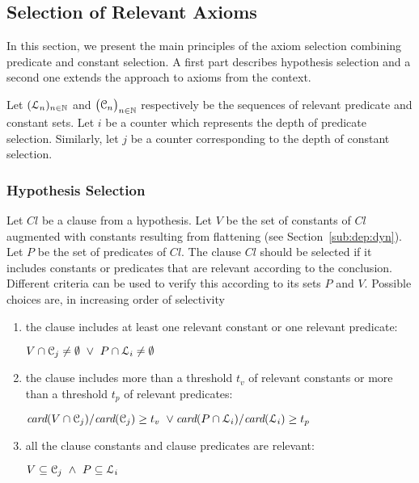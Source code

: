 \documentclass{acm_proc_article-sp}
\theoremstyle{nonumberplain}
\newcommand{\clause}{\mathit{Cl}}
\newcommand{\eV}{\EuScript C}
\newcommand{\Nats}[0]{\ensuremath{\mathbb{N}}}
\newcommand{\card}[1]{\ensuremath{\textit{card}(#1)}}
\newcommand{\eL}{\EuScript L}
\begin{document}
\subsection{Selection of Relevant Axioms}\label{sub:hyp:sel}
In this section, we present the main principles of the axiom selection
combining predicate and constant selection. A first part describes
hypothesis selection and a second one extends the approach to axioms
from the context.
 
Let $(\eL_n)_{n \in \Nats}$ and \( \big( {\eV}_n\big)_{n \in \Nats}\)
respectively be the sequences of relevant predicate and constant sets.
Let $i$ be a counter which represents the depth of predicate selection.
Similarly, let $j$ be a counter corresponding to the depth of constant
selection.




\subsubsection{Hypothesis Selection}
Let \(\clause\) be a clause from a hypothesis.
Let \(V\) be the set of constants of \(\clause\) augmented with 
constants resulting from flattening (see Section~\ref{sub:dep:dyn}). 
Let $P$ be the set of predicates of \(\clause\).
The clause \(\clause\) should be selected if 
it includes constants or predicates that are relevant according 
to the conclusion.
Different criteria can be used to verify this 
according to its sets \(P\) and \(V\).
Possible choices are, in increasing order of selectivity 
\begin{enumerate}
\item  
 the clause includes at least one relevant constant or one
 relevant predicate: 
 
\centerline{$V \cap  {\eV}_{j}  \neq \emptyset ~\lor~ P \cap {\eL}_i  \neq \emptyset $}



\item \label{item:stat} 
 the clause includes more than a threshold $t_v$ of relevant
 constants or  more than a threshold $t_p$ of 
 relevant predicates: \vspace*{3pt}

\centerline{$  {\card{V \cap {\eV}_{j}}/\card{{\eV}_{j}} \ge t_v} ~\lor 
     {\card{P \cap {\eL}_i}/\card{{\eL}_i} \ge t_p}$}
     

\item \label{item:include} 
  all the clause constants and clause predicates are relevant:

\centerline{$V \subseteq {\eV}_{j} ~\land~ P \subseteq {\eL}_i$}

\end{enumerate}
\end{document}
